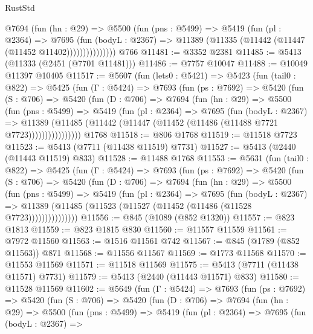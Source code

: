 \begin{lexlean}{RustStd}
\begin{coremodule}
                @7694
                  (fun (hn : @29) =>
                  @5500
                    (fun (pns : @5499) =>
                    @5419
                      (fun (pl : @2364) =>
                      @7695
                        (fun (bodyL : @2367) =>
                        @11389 (@11335 (@11442 (@11447 (@11452 @11402)))))))))))))))
    @766
@11481 := @3352 @2381
@11485 := @5413 (@11333 (@2451 (@7701 @11481)))
@11486 := @7757 @10047
@11488 := @10049 @11397 @10405
@11517 := @5607
    (fun (lets0 : @5421) =>
    @5423
      (fun (tail0 : @822) =>
      @5425
        (fun (Γ : @5424) =>
        @7693
          (fun (ps : @7692) =>
          @5420
            (fun (S : @706) =>
            @5420
              (fun (D : @706) =>
              @7694
                (fun (hn : @29) =>
                @5500
                  (fun (pns : @5499) =>
                  @5419
                    (fun (pl : @2364) =>
                    @7695
                      (fun (bodyL : @2367) =>
                      @11389
                        (@11485 (@11442 (@11447 (@11452 (@11486 (@11488 @7721 @7723))))))))))))))))
    @1768
@11518 := @806 @1768
@11519 := @11518 @7723
@11523 := @5413 (@7711 (@11438 @11519) @7731)
@11527 := @5413 (@2440 (@11443 @11519) @833)
@11528 := @11488 @1768
@11553 := @5631
    (fun (tail0 : @822) =>
    @5425
      (fun (Γ : @5424) =>
      @7693
        (fun (ps : @7692) =>
        @5420
          (fun (S : @706) =>
          @5420
            (fun (D : @706) =>
            @7694
              (fun (hn : @29) =>
              @5500
                (fun (pns : @5499) =>
                @5419
                  (fun (pl : @2364) =>
                  @7695
                    (fun (bodyL : @2367) =>
                    @11389 (@11485 (@11523 (@11527 (@11452 (@11486 (@11528 @7723)))))))))))))))
@11556 := @845 (@1089 (@852 @1320))
@11557 := @823 @1813
@11559 := @823 @1815 @830
@11560 := @11557 @11559
@11561 := @7972 @11560
@11563 := @1516 @11561 @742
@11567 := @845 (@1789 (@852 @11563)) @871
@11568 := @11556 @11567
@11569 := @1773 @11568
@11570 := @11553 @11569
@11571 := @11518 @11569
@11575 := @5413 (@7711 (@11438 @11571) @7731)
@11579 := @5413 (@2440 (@11443 @11571) @833)
@11580 := @11528 @11569
@11602 := @5649
    (fun (Γ : @5424) =>
    @7693
      (fun (ps : @7692) =>
      @5420
        (fun (S : @706) =>
        @5420
          (fun (D : @706) =>
          @7694
            (fun (hn : @29) =>
            @5500
              (fun (pns : @5499) =>
              @5419
                (fun (pl : @2364) =>
                @7695
                  (fun (bodyL : @2367) =>

\end{coremodule}
\end{lexlean}
